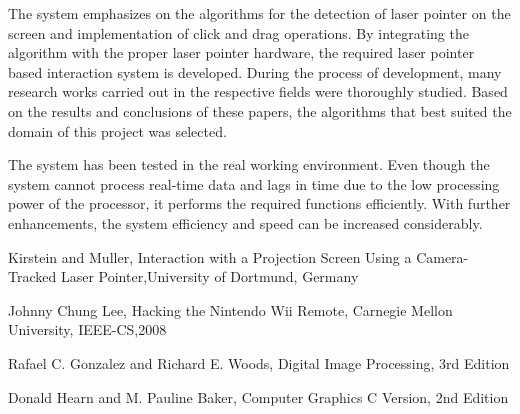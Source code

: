 \documentclass[12pt, a4paper]{article}
\begin{document}
   The system emphasizes on the algorithms for the detection of laser pointer on the screen and implementation of click  and drag operations. By integrating the algorithm with the proper laser pointer hardware, the required laser pointer based interaction system is developed. During the process of development, many research works carried out in the respective fields were thoroughly studied. Based on the results and conclusions of these papers, the algorithms that best suited the domain of this project was selected.
   
   The system has been tested in the real working environment. Even though the system cannot process real-time data and lags in time due to the low processing power of the processor, it performs the required functions efficiently. With further enhancements, the system efficiency and speed can be increased considerably. 
   
\newpage

\begin{thebibliography}{}
	 Kirstein and Muller, Interaction with a Projection Screen Using a Camera-Tracked Laser Pointer,University of Dortmund, Germany 
	

	 Johnny Chung Lee, Hacking the Nintendo Wii Remote, Carnegie 		   Mellon University, IEEE-CS,2008 

	
	 Rafael C. Gonzalez and Richard E. Woods, Digital Image Processing, 3rd Edition
	
	 Donald Hearn and M. Pauline Baker, Computer Graphics C Version, 2nd Edition 
\end{thebibliography}

\newpage
\appendix
\end{document}
